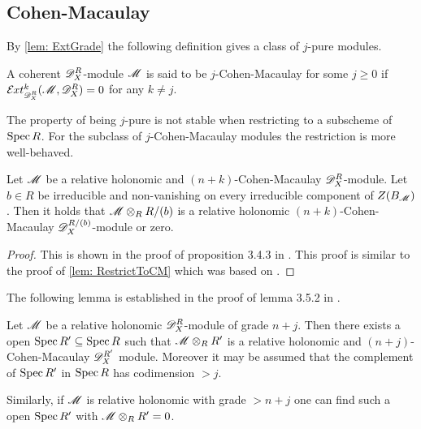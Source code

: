 \subsection{Cohen-Macaulay}
By \cref{lem: ExtGrade} the following definition gives a class of $j$-pure modules.
\begin{definition}\label{def: CohenMac}
  A coherent $\mathscr{D}_X^R$-module $\mathscr{M}$ is said to be $j$-Cohen-Macaulay for some $j\geq 0$ if $\Ex{\D_X^R}{k}(\M,\D_X^R) = 0$ for any $k\neq j$.
\end{definition}
The property of being $j$-pure is not stable when restricting to a subscheme of $\operatorname{Spec} R$.
For the subclass of $j$-Cohen-Macaulay modules the restriction is more well-behaved.
\begin{lemma}\label{lem: CMLemmaBudur}
  Let $\mathscr{M}$ be a relative holonomic and $(n+k)$-Cohen-Macaulay $\mathscr{D}_X^R$-module. Let $b\in R$ be irreducible and non-vanishing on every irreducible component of $Z(B_{\mathscr{M}})$. Then it holds that $\mathscr{M}\otimes_R R/(b)$ is a relative holonomic $(n+k)$-Cohen-Macaulay $\mathscr{D}_X^{R/(b)}$-module or zero.
\end{lemma}
\begin{proof}
  This is shown in the proof of proposition 3.4.3 in \cite{budur2019zero}. This proof is similar to the proof of \cref{lem: RestrictToCM} which was based on \cite{budur2019zero}.
\end{proof}
The following lemma is established in the proof of lemma 3.5.2 in \cite{budur2019zero}.
\begin{lemma}\label{lem: GradeToCMOverOpen}
  Let $\mathscr{M}$ be a relative holonomic $\mathscr{D}_X^R$-module of grade $n+j$. Then there exists a open $\operatorname{Spec} R' \subseteq \operatorname{Spec} R$ such that $\mathscr{M}\otimes_R R'$ is a relative holonomic and $(n+j)$-Cohen-Macaulay $\mathscr{D}_X^{R'}$ module. Moreover it may be assumed that the complement of $\operatorname{Spec} R'$ in $\operatorname{Spec} R$ has codimension $>j$.

  Similarly, if $\mathscr{M}$ is relative holonomic with grade $>n+j$ one can find such a open $\operatorname{Spec} R'$ with $\mathscr{M}\otimes_R R'=0$.
\end{lemma}
